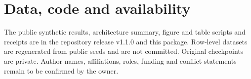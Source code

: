 \documentclass[12pt,a4paper]{article}
\begin{document}
\section*{Data, code and availability}
The public synthetic results, architecture summary, figure and table scripts and receipts are in the repository release v1.1.0 and this package. Row-level datasets are regenerated from public seeds and are not committed. Original checkpoints are private. Author names, affiliations, roles, funding and conflict statements remain to be confirmed by the owner.



\end{document}
